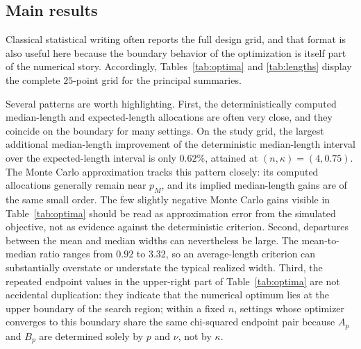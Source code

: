 \documentclass[11pt]{article}
\begin{document}
\subsection{Main results}
Classical statistical writing often reports the full design grid, and that format is also useful here because the boundary behavior of the optimization is itself part of the numerical story. Accordingly, Tables~\ref{tab:optima} and \ref{tab:lengths} display the complete $25$-point grid for the principal summaries.

\begin{table}[htbp]
\centering
\caption{Computed tail allocations, reported as $p_E$, $p_M$, and $p_{MC}$ for compactness, together with summary diagnostics for the expected-length interval, the deterministic median-length interval, and the Monte Carlo median-length sensitivity analysis over the full design grid.}
\label{tab:optima}
\resizebox{\textwidth}{!}{}
\end{table}

Several patterns are worth highlighting. First, the deterministically computed median-length and expected-length allocations are often very close, and they coincide on the boundary for many settings. On the study grid, the largest additional median-length improvement of the deterministic median-length interval over the expected-length interval is only $0.62\%$, attained at $(n,\kappa)=(4,0.75)$. The Monte Carlo approximation tracks this pattern closely: its computed allocations generally remain near $p_M$, and its implied median-length gains are of the same small order. The few slightly negative Monte Carlo gains visible in Table~\ref{tab:optima} should be read as approximation error from the simulated objective, not as evidence against the deterministic criterion. Second, departures between the mean and median widths can nevertheless be large. The mean-to-median ratio ranges from $0.92$ to $3.32$, so an average-length criterion can substantially overstate or understate the typical realized width. Third, the repeated endpoint values in the upper-right part of Table~\ref{tab:optima} are not accidental duplication: they indicate that the numerical optimum lies at the upper boundary of the search region; within a fixed $n$, settings whose optimizer converges to this boundary share the same chi-squared endpoint pair because $A_p$ and $B_p$ are determined solely by $p$ and $\nu$, not by $\kappa$.
\end{document}
